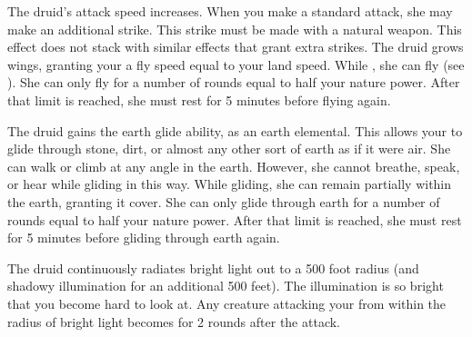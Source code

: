         The druid's attack speed increases.
        When you make a standard attack, she may make an additional strike.
        This strike must be made with a natural weapon.
        This effect does not stack with similar effects that grant extra strikes.
        The druid grows wings, granting your a fly speed equal to your land speed.
        While \unencumbered, she can fly (see ).
        She can only fly for a number of rounds equal to half your nature power.
        After that limit is reached, she must rest for 5 minutes before flying again.

        The druid gains the earth glide ability, as an earth elemental.
        This allows your to glide through stone, dirt, or almost any other sort of earth as if it were air.
        She can walk or climb at any angle in the earth.
        However, she cannot breathe, speak, or hear while gliding in this way.
        While gliding, she can remain partially within the earth, granting it cover.
        She can only glide through earth for a number of rounds equal to half your nature power.
        After that limit is reached, she must rest for 5 minutes before gliding through earth again.

        The druid continuously radiates bright light out to a 500 foot radius (and shadowy illumination for an additional 500 feet).
        The illumination is so bright that you become hard to look at.
        Any creature attacking your from within the radius of bright light becomes \partiallyblinded for 2 rounds after the attack.

